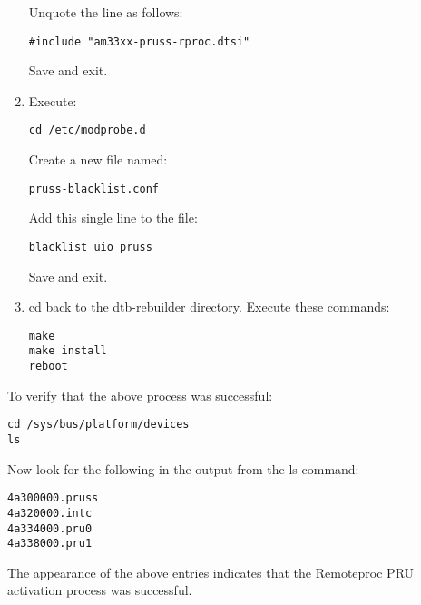 \begin{enumerate}
Unquote the line as follows:
\begin{verbatim}
#include "am33xx-pruss-rproc.dtsi"
\end{verbatim}
Save and exit.
\item
Execute:
\begin{verbatim}
cd /etc/modprobe.d
\end{verbatim}
Create a new file named:
\begin{verbatim}
pruss-blacklist.conf
\end{verbatim} 

Add this single line to the file:
\begin{verbatim}
blacklist uio_pruss
\end{verbatim}
Save and exit.
\item
cd back to the dtb-rebuilder directory.  Execute these commands:
\begin{verbatim}
make 
make install 
reboot
\end{verbatim} 
\end{enumerate}
To verify that the above process was successful:

\begin{verbatim}
cd /sys/bus/platform/devices
ls
\end{verbatim}

Now look for the following in the output from the ls command:
\begin{verbatim}
4a300000.pruss
4a320000.intc
4a334000.pru0
4a338000.pru1
\end{verbatim}

The appearance of the above entries indicates that the Remoteproc PRU activation process was successful.

